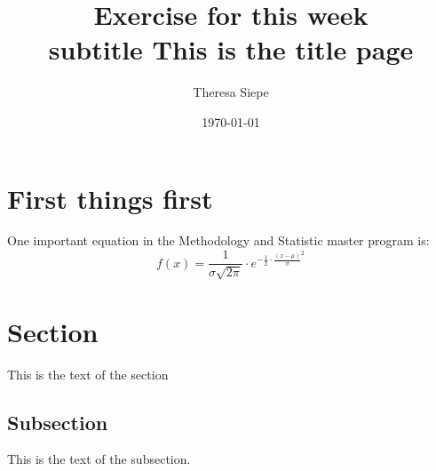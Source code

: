 \documentclass[10pt, a4paper, titlepage]{article}
\title{Exercise for this week\\subtitle This is the title page}
\author{Theresa Siepe}
\date{\today}
\begin{document}
\maketitle
\newpage

\section{First things first}

One important equation in the Methodology and Statistic master program is: 
\[f(x) = \frac{1}{\sigma \sqrt{2\pi}} \cdot e^{-\frac{1}{2}\cdot \frac{(x- \mu)}{\sigma}^{2}}\]


\section{Section}

This is the text of the section

\subsection{Subsection}

This is the text of the subsection.
\end{document}
